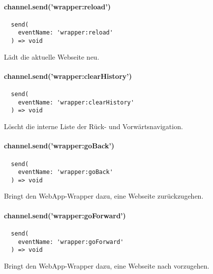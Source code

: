 
\paragraph{channel.send('wrapper:reload')}

\begin{verbatim}
  send(
    eventName: 'wrapper:reload'
  ) => void
\end{verbatim}

Lädt die aktuelle Webseite neu.


\paragraph{channel.send('wrapper:clearHistory')}

\begin{verbatim}
  send(
    eventName: 'wrapper:clearHistory'
  ) => void
\end{verbatim}

Löscht die interne Liste der Rück- und Vorwärtsnavigation.


\paragraph{channel.send('wrapper:goBack')}

\begin{verbatim}
  send(
    eventName: 'wrapper:goBack'
  ) => void
\end{verbatim}

Bringt den WebApp-Wrapper dazu, eine Webseite zurückzugehen.


\newpage

\paragraph{channel.send('wrapper:goForward')}

\begin{verbatim}
  send(
    eventName: 'wrapper:goForward'
  ) => void
\end{verbatim}

Bringt den WebApp-Wrapper dazu, eine Webseite nach vorzugehen.


